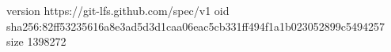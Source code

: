 version https://git-lfs.github.com/spec/v1
oid sha256:82ff53235616a8e3ad5d3d1caa06eac5cb331ff494f1a1b023052899c5494257
size 1398272
